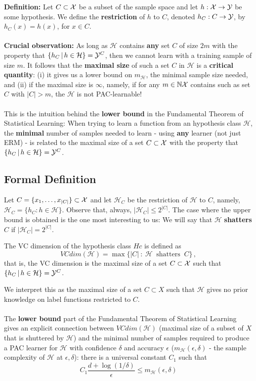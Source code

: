 \documentclass[11pt]{article}
\newcommand{\Hc}{\mathcal{H}}
\begin{document}
{\bf Definition:} Let $C\subset\mathcal{X}$ be a subset of the sample space and let $h:\mathcal{X}\to\mathcal{Y}$ be some hypothesis. 
We define the {\bf restriction} of $h$ to $C$, denoted $h_C:C\to\mathcal{Y}$, by $h_C(x)=h(x)$, for $x\in C$.
\\~\\
{\bf Crucial observation:} As long as $\Hc$ contains {\bf any} set $C$ of size
$2m$ with the property that $\{h_C\,|\,h\in\Hc\} = \Y^C$, then we cannot learn with a training sample of size $m$. It follows that the {\bf maximal size} of such a set $C$ in $\Hc$ is a {\bf critical quantity}: (i) it gives us a lower bound on $m_\Hc$, the minimal sample size needed, and (ii) if the maximal size is $\infty$, namely, if for any $m\in\mathbb{N} \mathcal{X}$ contains such as set $C$ with $|C|>m$, the $\Hc$ is not PAC-learnable!
\\~\\
This is the intuition behind the {\bf lower bound} in the Fundamental Theorem of Statistical
Learning: When trying to learn a function from an hypothesis class $\Hc$, the
{\bf minimal} number of samples needed to learn - using {\bf any} learner (not
just ERM) - is related to the maximal size of a set $C\subset \mathcal{X}$ with the
property that  $\{h_C\,|\,h\in\Hc\} = \Y^C$.

\subsection*{Formal Definition}

Let $C = \{x_1,\ldots,x_{|C|}\} \subset \mathcal{X}$ and let $\Hc_C$ be the restriction of $\Hc$ to $C$, namely,
 $\Hc_C = \{ h_C : h \in \Hc\}$.
 Observe that, always, $|\Hc_C|\leq 2^{|C|}$. The case where the upper bound is
 obtained is the one most interesting to us: 
We will say that $\Hc$ \textbf{shatters} $C$ if $|\Hc_C| =  2^{|C|}$.  
\begin{definition}
The VC dimension of the hypothesis class $Hc$ is defined as 
$$VCdim(\Hc) = \max\{ |C| ~:~ \Hc~\,\,\textrm{shatters}~\,\,C \}\,,$$
that is, the VC dimension is the maximal size of a set $C\subset \mathcal{X}$ such that
$\{h_C\,|\,h\in\Hc\} = \Y^C$.
\end{definition}
We interpret this as the maximal size of a set $C\subset X$ such that 
$\Hc$ gives no prior knowledge on label functions restricted to $C$.
\\
~\\ The {\bf lower bound} part of the Fundamental Theorem of Statistical
Learning gives an explicit connection between $VCdim(\Hc)$ (maximal size of a
subset of $X$ that is shuttered by $\Hc$) and the minimal
number of samples required to produce a PAC learner for $\Hc$ with confidence
$\delta$ and accuracy $\epsilon$ ($ m_\Hc(\epsilon,\delta)$ - the sample
complexity of $\Hc$ at $\epsilon,\delta$): there is a universal constant $C_1$
such that
\[
 C_1
    \frac{d + \log(1/\delta)}{\epsilon} \le m_\Hc(\epsilon,\delta)\]
\end{document}
